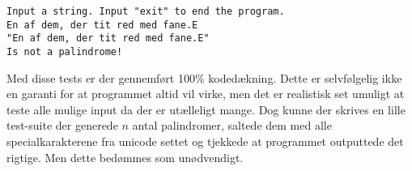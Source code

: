 	\begin{lstlisting}[caption=Afvisning af ikke-palindrom]
Input a string. Input "exit" to end the program.
En af dem, der tit red med fane.E
"En af dem, der tit red med fane.E"
Is not a palindrome!
	\end{lstlisting}
	Med disse tests er der gennemført 100\% kodedækning. Dette er selvfølgelig ikke en garanti for at programmet altid vil virke, men det er realistisk set umuligt at teste alle mulige input da der er utælleligt mange. Dog kunne der skrives en lille test-suite der generede $n$ antal palindromer, saltede dem med alle specialkarakterene fra unicode settet og tjekkede at programmet outputtede det rigtige. Men dette bedømmes som unødvendigt.
	